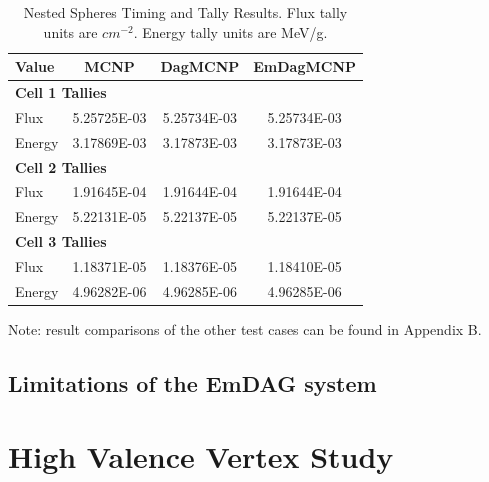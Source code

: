 \documentclass[10pt, a4paper]{article}
\begin{document}
\begin{table}[H]
  \small
  \begin{center}
    \caption{Nested Spheres Timing and Tally Results. Flux tally units are $cm^{-2}$. Energy tally units are MeV/g.}
    \label{nestedspheres}
    \begin{tabular}{lccc}
      \toprule
      Value & MCNP & DagMCNP & EmDagMCNP \\
      \toprule
      \multicolumn{4}{l}{\textbf{Cell 1 Tallies}} \\
      \hline
      Flux  & 5.25725E-03 & 5.25734E-03 & 5.25734E-03 \\
      Energy  & 3.17869E-03 &  3.17873E-03 &  3.17873E-03 \\
      \hline
      \multicolumn{4}{l}{\textbf{Cell 2 Tallies}} \\
      \hline
      Flux  & 1.91645E-04 & 1.91644E-04 & 1.91644E-04 \\
      Energy  & 5.22131E-05 & 5.22137E-05 & 5.22137E-05 \\
      \hline
      \multicolumn{4}{l}{\textbf{Cell 3 Tallies}} \\
      \hline
      Flux  & 1.18371E-05 & 1.18376E-05 & 1.18410E-05 \\
      Energy  & 4.96282E-06 & 4.96285E-06 & 4.96285E-06 \\
      \bottomrule
                        
    \end{tabular}

  \end{center}
\end{table}

Note: result comparisons of the other test cases can be found in Appendix B.


\subsection{Limitations of the EmDAG system}

\section{High Valence Vertex Study}
\end{document}
